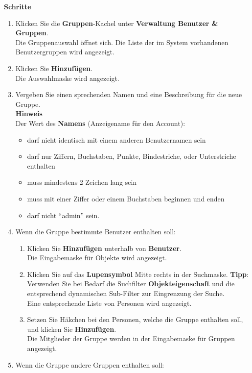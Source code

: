 \documentclass[
  letterpaper,
  DIV=11,
  numbers=noendperiod]{scrreprt}
\providecommand{\tightlist}{%
  \setlength{\itemsep}{0pt}\setlength{\parskip}{0pt}}\usepackage{longtable,booktabs,array}
\begin{document}
\textbf{Schritte}

\begin{enumerate}
\def\labelenumi{\arabic{enumi}.}
\item
  Klicken Sie die \textbf{Gruppen}-Kachel unter \textbf{Verwaltung
  Benutzer \& Gruppen}.\\
  Die Gruppenauswahl öffnet sich. Die Liste der im System vorhandenen
  Benutzergruppen wird angezeigt.
\item
  Klicken Sie \textbf{Hinzufügen}.\\
  Die Auswahlmaske wird angezeigt.
\item
  Vergeben Sie einen sprechenden Namen und eine Beschreibung für die
  neue Gruppe.\\
  \textbf{Hinweis}\\
  Der Wert des \textbf{Namens} (Anzeigename für den Account):

  \begin{itemize}
  \tightlist
  \item
    darf nicht identisch mit einem anderen Benutzernamen sein
  \item
    darf nur Ziffern, Buchstaben, Punkte, Bindestriche, oder
    Unterstriche enthalten
  \item
    muss mindestens 2 Zeichen lang sein
  \item
    muss mit einer Ziffer oder einem Buchstaben beginnen und enden
  \item
    darf nicht ``admin'' sein.
  \end{itemize}
\item
  Wenn die Gruppe bestimmte Benutzer enthalten soll:

  \begin{enumerate}
  \def\labelenumii{\arabic{enumii}.}
  \tightlist
  \item
    Klicken Sie \textbf{Hinzufügen} unterhalb von \textbf{Benutzer}.\\
    Die Eingabemaske für Objekte wird angezeigt.\\
  \item
    Klicken Sie auf das \textbf{Lupensymbol} Mitte rechts in der
    Suchmaske. \textbf{Tipp}:\\
    Verwenden Sie bei Bedarf die Suchfilter \textbf{Objekteigenschaft}
    und die entsprechend dynamischen Sub-Filter zur Eingrenzung der
    Suche.\\
    Eine entsprechende Liste von Personen wird angezeigt.
  \item
    Setzen Sie Häkchen bei den Personen, welche die Gruppe enthalten
    soll, und klicken Sie \textbf{Hinzufügen}.\\
    Die Mitglieder der Gruppe werden in der Eingabemaske für Gruppen
    angezeigt.\\
  \end{enumerate}
\item
  Wenn die Gruppe andere Gruppen enthalten soll:


\end{enumerate}
\end{document}
